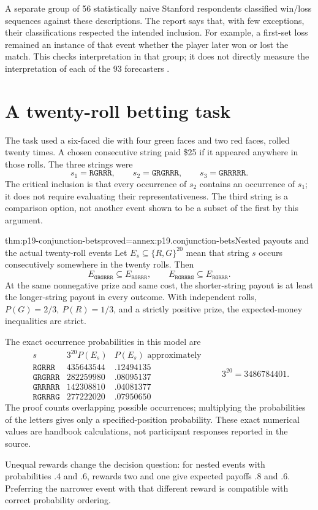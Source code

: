 A separate group of 56 statistically naive Stanford respondents classified
win/loss sequences against these descriptions. The report says that,
with few exceptions, their classifications respected the intended
inclusion. For example, a first-set loss remained an instance of that
event whether the player later won or lost the match.
This checks interpretation in that group; it does not directly measure
the interpretation of each of the 93 forecasters
\cite[pp.~302--303]{TverskyKahneman1983Conjunction}.

\section{A twenty-roll betting task}
\label{sec:p19-conjunction-betting}

The task used a six-faced die with four green faces and two red faces,
rolled twenty times. A chosen consecutive string paid \$25 if it
appeared anywhere in those rolls. The three strings were
\[
       s_1=\texttt{RGRRR},\qquad
       s_2=\texttt{GRGRRR},\qquad
       s_3=\texttt{GRRRRR}.
\]
The critical inclusion is that every occurrence of \(s_2\) contains
an occurrence of \(s_1\); it does not require evaluating their
representativeness. The third string is a comparison option, not
another event shown to be a subset of the first by this argument.

\begin{hbtheorem}{thm:p19-conjunction-bets}{proved=annex:p19.conjunction-bets}{Nested payouts and the actual twenty-roll events}
Let \(E_s\subseteq\{R,G\}^{20}\) mean that string \(s\) occurs
consecutively somewhere in the twenty rolls. Then
\[
 E_{\texttt{GRGRRR}}\subseteq E_{\texttt{RGRRR}},
 \qquad
 E_{\texttt{RGRRRG}}\subseteq E_{\texttt{RGRRR}}.
\]
At the same nonnegative prize and same cost, the shorter-string
payout is at least the longer-string payout in every outcome.
With independent rolls, \(P(G)=2/3,\ P(R)=1/3\), and a strictly
positive prize, the expected-money inequalities are strict.

The exact occurrence probabilities in this model are
\[
\begin{array}{c|r|c}
s&3^{20}P(E_s)&P(E_s)\text{ approximately}\\ \hline
\texttt{RGRRR}&435643544&.12494135\\
\texttt{GRGRRR}&282259980&.08095137\\
\texttt{GRRRRR}&142308810&.04081377\\
\texttt{RGRRRG}&277222020&.07950650
\end{array}
\qquad 3^{20}=3486784401.
\]
The proof counts overlapping possible occurrences; multiplying the
probabilities of the letters gives only a specified-position probability.
These exact numerical values are handbook calculations, not participant
responses reported in the source.

Unequal rewards change the decision question: for nested events
with probabilities .4 and .6, rewards two and one give expected
payoffs .8 and .6. Preferring the narrower event with that different
reward is compatible with correct probability ordering.
\end{hbtheorem}

